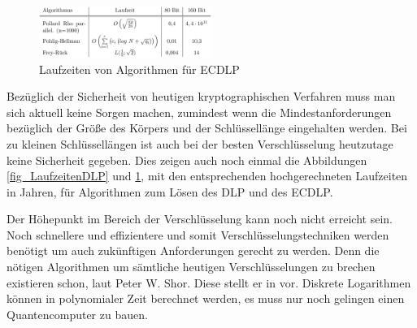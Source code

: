 	\begin{figure}
		\centering
		\includegraphics[width=0.5\textwidth]{includes/images/LaufzeitenECDLP.PNG}
		\caption{Laufzeiten von Algorithmen für ECDLP~\cite{DLP:ECDLP:Probleme:und:Loesungen}}
		\label{fig_LaufzeitenECDLP}
	\end{figure}

	Bezüglich der Sicherheit von heutigen kryptographischen Verfahren muss man sich aktuell keine Sorgen machen, zumindest wenn die Mindestanforderungen bezüglich der Größe des Körpers und der Schlüssellänge eingehalten werden. Bei zu kleinen Schlüssellängen ist auch bei der besten Verschlüsselung heutzutage keine Sicherheit gegeben. Dies zeigen auch noch einmal die Abbildungen \ref{fig_LaufzeitenDLP} und \ref{fig_LaufzeitenECDLP}, mit den entsprechenden hochgerechneten Laufzeiten in Jahren, für Algorithmen zum Lösen des DLP und des ECDLP.
	
	Der Höhepunkt im Bereich der Verschlüsselung kann noch nicht erreicht sein. Noch schnellere und effizientere und somit  Verschlüsselungstechniken werden benötigt um auch zukünftigen Anforderungen gerecht zu werden. Denn die nötigen Algorithmen um sämtliche heutigen Verschlüsselungen zu brechen existieren schon, laut Peter W. Shor. Diese stellt er in \cite{Algorithms:for:Quantum:Computation:Discrete:Logarithms:and:Factoring} vor. Diskrete Logarithmen können in polynomialer Zeit berechnet werden, es muss nur noch gelingen einen Quantencomputer zu bauen.